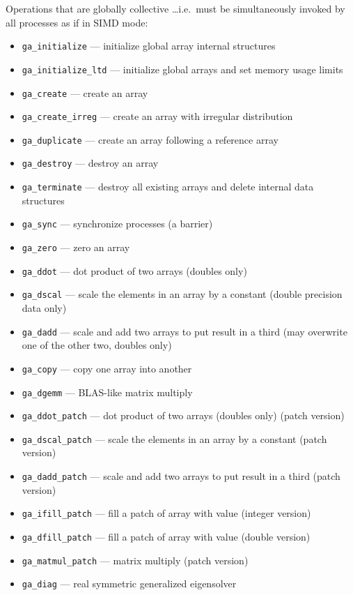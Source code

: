 Operations that are globally collective \ldots i.e.\ must be
simultaneously invoked by all processes as if in SIMD mode:
\begin{itemize}
\item {\tt ga\_initialize} --- initialize global array internal
  structures
\item {\tt ga\_initialize\_ltd} --- initialize global arrays and set
  memory usage limits
\item {\tt ga\_create} --- create an array
\item {\tt ga\_create\_irreg} --- create an array with irregular
  distribution
\item {\tt ga\_duplicate} --- create an array following a reference
  array
\item {\tt ga\_destroy} --- destroy an array
\item {\tt ga\_terminate} --- destroy all existing arrays and delete
  internal data structures
\item {\tt ga\_sync} --- synchronize processes (a barrier)
\item {\tt ga\_zero} --- zero an array
\item {\tt ga\_ddot} --- dot product of two arrays (doubles only)
\item {\tt ga\_dscal} --- scale the elements in an array by a constant
  (double precision data only)
\item {\tt ga\_dadd} --- scale and add two arrays to put result in a
  third (may overwrite one of the other two, doubles only)
\item {\tt ga\_copy} --- copy one array into another
\item {\tt ga\_dgemm} --- BLAS-like matrix multiply
\item {\tt ga\_ddot\_patch} --- dot product of two arrays (doubles
  only) (patch version)
\item {\tt ga\_dscal\_patch} --- scale the elements in an array by a
  constant (patch version)
\item {\tt ga\_dadd\_patch} --- scale and add two arrays to put result
  in a third (patch version)
\item {\tt ga\_ifill\_patch} --- fill a patch of array with value
  (integer version)
\item {\tt ga\_dfill\_patch} --- fill a patch of array with value
  (double version)
\item {\tt ga\_matmul\_patch} --- matrix multiply (patch version)
\item {\tt ga\_diag} --- real symmetric generalized eigensolver

\end{itemize}
